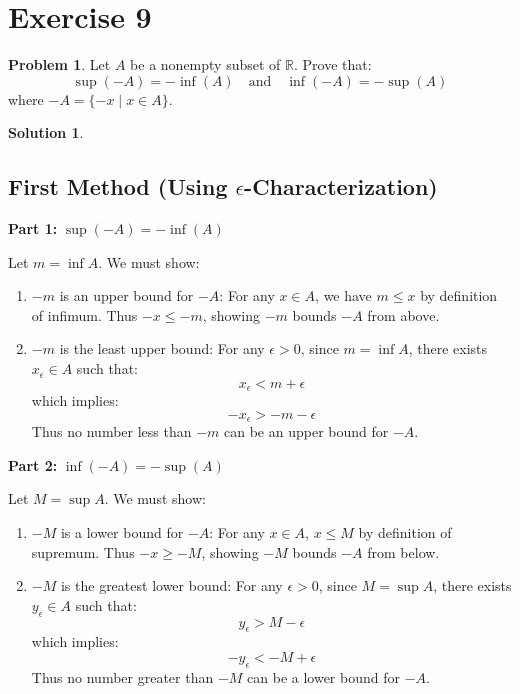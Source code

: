 \documentclass{article}
\theoremstyle{definition}
\newtheorem{problem}{Problem}
\newtheorem*{solution}{Solution}
\begin{document}
\section*{Exercise 9}

\begin{problem}
Let \( A \) be a nonempty subset of \( \mathbb{R} \). Prove that:
\[
\sup(-A) = -\inf(A) \quad \text{and} \quad \inf(-A) = -\sup(A)
\]
where \(-A = \{-x \mid x \in A\}\).
\end{problem}

\begin{solution}

\subsection*{First Method (Using $\epsilon$-Characterization)}

\textbf{Part 1:} $\sup(-A) = -\inf(A)$

Let $m = \inf A$. We must show:
\begin{enumerate}
    \item $-m$ is an upper bound for $-A$:
    For any $x \in A$, we have $m \leq x$ by definition of infimum. Thus $-x \leq -m$, showing $-m$ bounds $-A$ from above.
    
    \item $-m$ is the least upper bound:
    For any $\epsilon > 0$, since $m = \inf A$, there exists $x_\epsilon \in A$ such that:
    \[ x_\epsilon < m + \epsilon \]
    which implies:
    \[ -x_\epsilon > -m - \epsilon \]
    Thus no number less than $-m$ can be an upper bound for $-A$.
\end{enumerate}

\textbf{Part 2:} $\inf(-A) = -\sup(A)$

Let $M = \sup A$. We must show:
\begin{enumerate}
    \item $-M$ is a lower bound for $-A$:
    For any $x \in A$, $x \leq M$ by definition of supremum. Thus $-x \geq -M$, showing $-M$ bounds $-A$ from below.
    
    \item $-M$ is the greatest lower bound:
    For any $\epsilon > 0$, since $M = \sup A$, there exists $y_\epsilon \in A$ such that:
    \[ y_\epsilon > M - \epsilon \]
    which implies:
    \[ -y_\epsilon < -M + \epsilon \]
    Thus no number greater than $-M$ can be a lower bound for $-A$.
\end{enumerate}


\end{solution}
\end{document}
